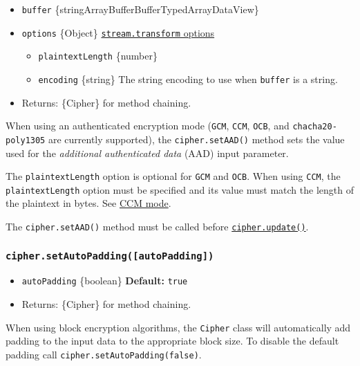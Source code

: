 \begin{itemize}
\tightlist
\item
  \texttt{buffer}
  \{string\textbar ArrayBuffer\textbar Buffer\textbar TypedArray\textbar DataView\}
\item
  \texttt{options} \{Object\}
  \href{stream.md\#new-streamtransformoptions}{\texttt{stream.transform}
  options}

  \begin{itemize}
  \tightlist
  \item
    \texttt{plaintextLength} \{number\}
  \item
    \texttt{encoding} \{string\} The string encoding to use when
    \texttt{buffer} is a string.
  \end{itemize}
\item
  Returns: \{Cipher\} for method chaining.
\end{itemize}

When using an authenticated encryption mode (\texttt{GCM}, \texttt{CCM},
\texttt{OCB}, and \texttt{chacha20-poly1305} are currently supported),
the \texttt{cipher.setAAD()} method sets the value used for the
\emph{additional authenticated data} (AAD) input parameter.

The \texttt{plaintextLength} option is optional for \texttt{GCM} and
\texttt{OCB}. When using \texttt{CCM}, the \texttt{plaintextLength}
option must be specified and its value must match the length of the
plaintext in bytes. See \hyperref[ccm-mode]{CCM mode}.

The \texttt{cipher.setAAD()} method must be called before
\hyperref[cipherupdatedata-inputencoding-outputencoding]{\texttt{cipher.update()}}.

\subsubsection{\texorpdfstring{\texttt{cipher.setAutoPadding({[}autoPadding{]})}}{cipher.setAutoPadding({[}autoPadding{]})}}\label{cipher.setautopaddingautopadding}

\begin{itemize}
\tightlist
\item
  \texttt{autoPadding} \{boolean\} \textbf{Default:} \texttt{true}
\item
  Returns: \{Cipher\} for method chaining.
\end{itemize}

When using block encryption algorithms, the \texttt{Cipher} class will
automatically add padding to the input data to the appropriate block
size. To disable the default padding call
\texttt{cipher.setAutoPadding(false)}.

